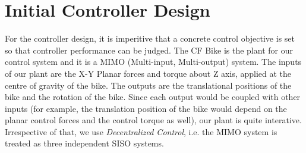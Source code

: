 \changefontsizes{20pt}
\chapter{Initial Controller Design}
\label{cha:chap3}
\changefontsizes{12pt}
For the controller design, it is imperitive that a concrete control objective is set so that controller performance can be judged. The CF Bike is the plant for our control system and it is a MIMO (Multi-input, Multi-output) system. The inputs of our plant are the X-Y Planar forces and torque about Z axis, applied at the centre of gravity of the bike. The outputs are the translational positions of the bike and the rotation of the bike. Since each output would be coupled with other inputs (for example, the translation position of the bike would depend on the planar control forces and the control torque as well), our plant is quite interative. Irrespective of that, we use \emph{Decentralized Control}, i.e. the MIMO system is treated as three independent SISO systems.

